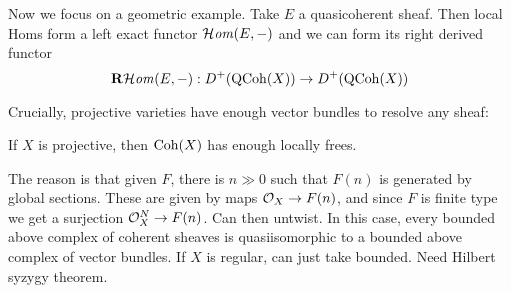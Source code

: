 %




Now we focus on a geometric example. Take $E$ a quasicoherent sheaf. Then local Homs form a left exact functor $\operatorname{\mathcal{H}\mathit{om}}(E,-)$ and we can form its right derived functor
\begin{equation*}
    \operatorname{\mathbf{R}\mathcal{H}\mathit{om}}(E,-):D^+(\operatorname{QCoh}(X))\to D^+(\operatorname{QCoh}(X))
\end{equation*}


Crucially, projective varieties have enough vector bundles to resolve any sheaf:

\begin{proposition}{}{}
    If $X$ is projective, then $\operatorname{Coh}(X)$ has enough locally frees.
\end{proposition}

The reason is that given $F$, there is $n\gg0$ such that $F(n)$ is generated by global sections. These are given by maps $\mathcal{O}_X\to F(n)$, and since $F$ is finite type we get a surjection $\mathcal{O}_X^N\to F(n)$. Can then untwist. In this case, every bounded above complex of coherent sheaves is quasiisomorphic to a bounded above complex of vector bundles. If $X$ is regular, can just take bounded. Need Hilbert syzygy theorem.

